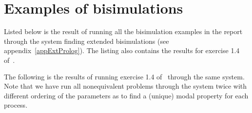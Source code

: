 \chapter{Examples of bisimulations}\label{appExamples}

Listed below is the result of running all the bisimulation examples in the report through the system finding extended bisimulations (see appendix~\ref{appExtProlog}). The listing also contains the results for exercise 1.4 of~\cite{Milner}.

\newpage

%
%
%
%

\noindent
The following is the results of running exercise 1.4 of~\cite{Milner} through the same system. Note that we have run all nonequivalent problems through the system twice with different ordering of the parameters as to find a (unique) modal property for each process.
%
%

%
%

%
%

%
%

%
%

%
%

%
%

%
%

